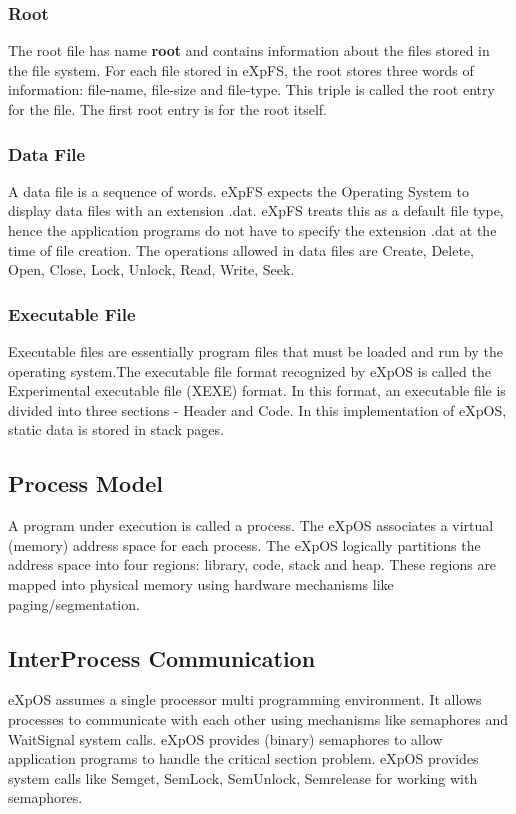 \documentclass[10pt]{article}
\begin{document}
\subsubsection{Root}
The root file has name \textbf {root} and contains information about the files stored in the file system. For each file stored in eXpFS, the root stores three words of information: file-name, file-size and file-type. This triple is called the root entry for the file. The first root entry is for the root itself.  
\subsubsection{Data File}
A data file is a sequence of words. eXpFS expects the Operating System to display data files with an extension .dat.   eXpFS treats this as a default file type, hence the application programs do not have to specify the extension .dat at the time of file creation.  
The operations allowed in data files are Create, Delete, Open, Close, Lock, Unlock, Read, Write, Seek.
\subsubsection{Executable File}
Executable files are essentially program files that must be loaded and run by the operating system.The executable file format recognized by eXpOS is called the Experimental executable file (XEXE) format. In this format, an executable file is divided into three sections - Header and Code. In this implementation of eXpOS, static data is stored in stack pages.
\subsection{Process Model}
A program under execution is called a process. The eXpOS associates a virtual (memory) address space for each process. The eXpOS logically partitions the address space into four regions: library, code, stack and heap. These regions are mapped into physical memory using hardware mechanisms like paging/segmentation.
\subsection{Inter\-Process Communication}
eXpOS assumes a single processor multi programming environment. It allows processes to communicate with each other using mechanisms like semaphores and Wait\-Signal system calls.
eXpOS provides (binary) semaphores to allow application programs to handle the critical section problem. eXpOS provides system calls like Semget, SemLock, SemUnlock, Semrelease for working with semaphores.
\end{document}
